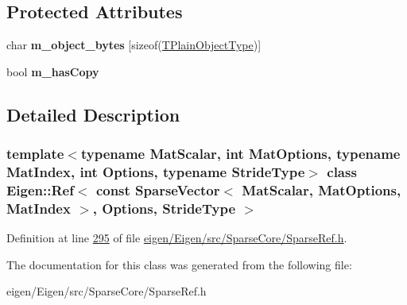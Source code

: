 \subsection*{Protected Attributes}
\begin{DoxyCompactItemize}
\item 
\mbox{\label{class_eigen_1_1_ref_3_01const_01_sparse_vector_3_01_mat_scalar_00_01_mat_options_00_01_mat_index673660e6a13ed7a7b712b0f75a25d720_ab7cf57fd5ed26108f4f81b8ca8047d6b}} 
char {\bfseries m\+\_\+object\+\_\+bytes} \mbox{[}sizeof(\hyperlink{group___sparse_core___module_class_eigen_1_1_sparse_vector}{T\+Plain\+Object\+Type})\mbox{]}
\item 
\mbox{\label{class_eigen_1_1_ref_3_01const_01_sparse_vector_3_01_mat_scalar_00_01_mat_options_00_01_mat_index673660e6a13ed7a7b712b0f75a25d720_a2e1cf70757c4c5900a67acaa40e9d0ac}} 
bool {\bfseries m\+\_\+has\+Copy}
\end{DoxyCompactItemize}


\subsection{Detailed Description}
\subsubsection*{template$<$typename Mat\+Scalar, int Mat\+Options, typename Mat\+Index, int Options, typename Stride\+Type$>$\newline
class Eigen\+::\+Ref$<$ const Sparse\+Vector$<$ Mat\+Scalar, Mat\+Options, Mat\+Index $>$, Options, Stride\+Type $>$}



Definition at line \hyperlink{eigen_2_eigen_2src_2_sparse_core_2_sparse_ref_8h_source_l00295}{295} of file \hyperlink{eigen_2_eigen_2src_2_sparse_core_2_sparse_ref_8h_source}{eigen/\+Eigen/src/\+Sparse\+Core/\+Sparse\+Ref.\+h}.



The documentation for this class was generated from the following file\+:\begin{DoxyCompactItemize}
\item 
eigen/\+Eigen/src/\+Sparse\+Core/\+Sparse\+Ref.\+h\end{DoxyCompactItemize}
